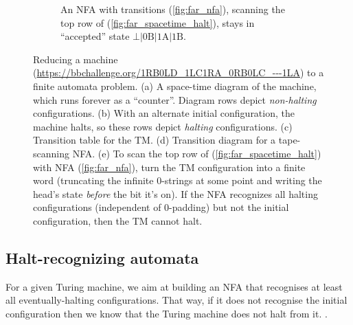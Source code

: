 \begin{figure}
\begin{subfigure}{\textwidth}
    \caption{An NFA with transitions (\ref{fig:far_nfa}), scanning the top row of (\ref{fig:far_spacetime_halt}), stays in ``accepted'' state
      $\bot|\textrm{0B}|\textrm{1A}|\textrm{1B}$.}
    \label{fig:far_scan}
  \end{subfigure}

  \caption{Reducing a machine (\url{https://bbchallenge.org/1RB0LD_1LC1RA_0RB0LC_---1LA}) to a finite automata problem.
    (a) A space-time diagram of the machine, which runs forever as a ``counter''. Diagram rows depict \emph{non-halting} configurations.
    (b) With an alternate initial configuration, the machine halts, so these rows depict \emph{halting} configurations.
    (c) Transition table for the TM.
    (d) Transition diagram for a tape-scanning NFA.
    (e) To scan the top row of (\ref{fig:far_spacetime_halt}) with NFA (\ref{fig:far_nfa}), turn the TM configuration into a finite word
        (truncating the infinite 0-strings at some point and writing the head's state \emph{before} the bit it's on).
        If the NFA recognizes all halting configurations (independent of 0-padding) but not the initial configuration, then the TM cannot halt.}
  \label{fig:finite-automata-reduction}
\end{figure}


\subsection{Halt-recognizing automata}
\newcommand{\M}{M}
\newcommand{\T}{^t}
\label{far-defs-recognizer}
For a given Turing machine, we aim at building an NFA that recognises at least all eventually-halting configurations. That way, if it does not recognise the initial configuration then we know that the Turing machine does not halt from it.
.


